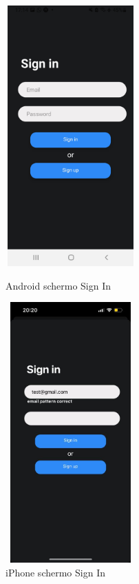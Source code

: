 \begin{figure}[H]
    \begin{minipage}[h]{0.47\textwidth}
        \centering
        \includegraphics[width=5cm, height=10cm]{images/immaginiAndroid/signIn.jpg}
        \caption{\label{signInAndroid} Android schermo Sign In}
    \end{minipage}
    \hfill
    \begin{minipage}[h]{0.47\textwidth}
        \centering
        \includegraphics[width=5cm, height=10cm]{images/immaginiPhone/signIn.jpeg}
        \caption{\label{signIniPhone}iPhone schermo Sign In}
    \end{minipage}
    \begin{minipage}[h]{0.47\textwidth}

\end{minipage}
\end{figure}
